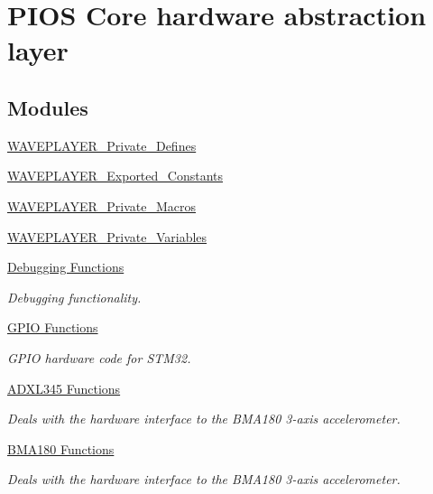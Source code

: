 \hypertarget{group___p_i_o_s}{\section{P\-I\-O\-S Core hardware abstraction layer}
\label{group___p_i_o_s}
}
\subsection*{Modules}
\begin{DoxyCompactItemize}
\item 
\hyperlink{group___w_a_v_e_p_l_a_y_e_r___private___defines}{W\-A\-V\-E\-P\-L\-A\-Y\-E\-R\-\_\-\-Private\-\_\-\-Defines}
\item 
\hyperlink{group___w_a_v_e_p_l_a_y_e_r___exported___constants}{W\-A\-V\-E\-P\-L\-A\-Y\-E\-R\-\_\-\-Exported\-\_\-\-Constants}
\item 
\hyperlink{group___w_a_v_e_p_l_a_y_e_r___private___macros}{W\-A\-V\-E\-P\-L\-A\-Y\-E\-R\-\_\-\-Private\-\_\-\-Macros}
\item 
\hyperlink{group___w_a_v_e_p_l_a_y_e_r___private___variables}{W\-A\-V\-E\-P\-L\-A\-Y\-E\-R\-\_\-\-Private\-\_\-\-Variables}
\item 
\hyperlink{group___p_i_o_s___d_e_b_u_g}{Debugging Functions}
\begin{DoxyCompactList}\small\item\em Debugging functionality. \end{DoxyCompactList}\item 
\hyperlink{group___p_i_o_s___g_p_i_o}{G\-P\-I\-O Functions}
\begin{DoxyCompactList}\small\item\em G\-P\-I\-O hardware code for S\-T\-M32. \end{DoxyCompactList}\item 
\hyperlink{group___p_i_o_s___a_d_x_l345}{A\-D\-X\-L345 Functions}
\begin{DoxyCompactList}\small\item\em Deals with the hardware interface to the B\-M\-A180 3-\/axis accelerometer. \end{DoxyCompactList}\item 
\hyperlink{group___p_i_o_s___b_m_a180}{B\-M\-A180 Functions}
\begin{DoxyCompactList}\small\item\em Deals with the hardware interface to the B\-M\-A180 3-\/axis accelerometer. \end{DoxyCompactList}\item 

\end{DoxyCompactItemize}
